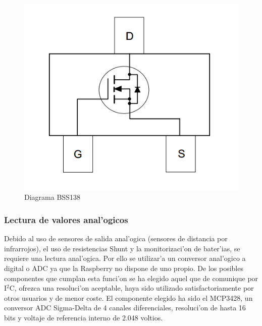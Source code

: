 \documentclass[twoside,12pt]{article}
\begin{document}
\begin{figure}[ht]
\centering
\includegraphics[scale=0.30]{images/bss138_diagram.png}
\caption{Diagrama BSS138}
\label{fig:BSS138}
\end{figure} 

\subsubsection{Lectura de valores anal'ogicos}
Debido al uso de sensores de salida anal'ogica (sensores de distancia por infrarrojos), el uso de resistencias Shunt y la monitorizaci'on de bater'ias, se requiere una lectura anal'ogica. Por ello se utilizar'a un conversor anal'ogico a digital o ADC ya que la Raspberry no dispone de uno propio. De los posibles componentes que cumplan esta funci'on se ha elegido aquel que de comunique por I$^{2}$C, ofrezca una resoluci'on aceptable, haya sido utilizado satisfactoriamente por otros usuarios y de menor coste. El componente elegido ha sido el MCP3428, un conversor ADC Sigma-Delta de 4 canales diferenciales, resoluci'on de hasta 16 bits y voltaje de referencia interno de 2.048 voltios.
\end{document}
